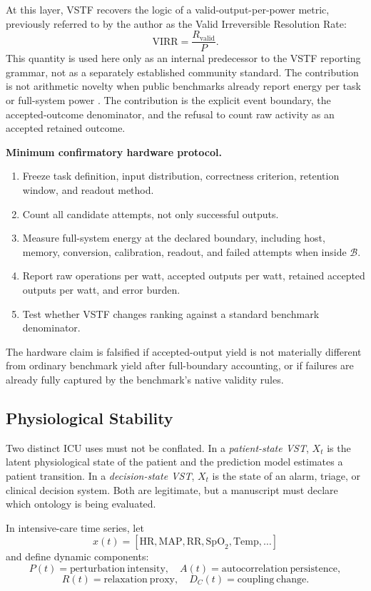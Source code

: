 \documentclass[11pt,a4paper]{article}
\newcommand{\VIRR}{\ensuremath{\mathrm{VIRR}}}
\newcommand{\1}{\mathbf{1}}
\begin{document}
At this layer, VSTF recovers the logic of a valid-output-per-power metric, previously referred to by the author as the Valid Irreversible Resolution Rate:
\[
  \VIRR = \frac{R_{\mathrm{valid}}}{P}.
\]
This quantity is used here only as an internal predecessor to the VSTF reporting grammar, not as a separately established community standard. The contribution is not arithmetic novelty when public benchmarks already report energy per task or full-system power \cite{mlperf}. The contribution is the explicit event boundary, the accepted-outcome denominator, and the refusal to count raw activity as an accepted retained outcome.

\noindent\textbf{Minimum confirmatory hardware protocol.}
\begin{enumerate}
  \item Freeze task definition, input distribution, correctness criterion, retention window, and readout method.
  \item Count all candidate attempts, not only successful outputs.
  \item Measure full-system energy at the declared boundary, including host, memory, conversion, calibration, readout, and failed attempts when inside $\mathcal{B}$.
  \item Report raw operations per watt, accepted outputs per watt, retained accepted outputs per watt, and error burden.
  \item Test whether VSTF changes ranking against a standard benchmark denominator.
\end{enumerate}

The hardware claim is falsified if accepted-output yield is not materially different from ordinary benchmark yield after full-boundary accounting, or if failures are already fully captured by the benchmark's native validity rules.

\subsection{Physiological Stability}

Two distinct ICU uses must not be conflated. In a \emph{patient-state VST}, $X_t$ is the latent physiological state of the patient and the prediction model estimates a patient transition. In a \emph{decision-state VST}, $X_t$ is the state of an alarm, triage, or clinical decision system. Both are legitimate, but a manuscript must declare which ontology is being evaluated.

In intensive-care time series, let
\[
  x(t)=[\mathrm{HR},\mathrm{MAP},\mathrm{RR},\mathrm{SpO}_2,\mathrm{Temp},\ldots]
\]
and define dynamic components:
\[
  P(t) = \mathrm{perturbation\ intensity},\quad
  A(t) = \mathrm{autocorrelation\ persistence},
\]
\[
  R(t) = \mathrm{relaxation\ proxy},\quad
  D_C(t)=\mathrm{coupling\ change}.
\]
\end{document}
